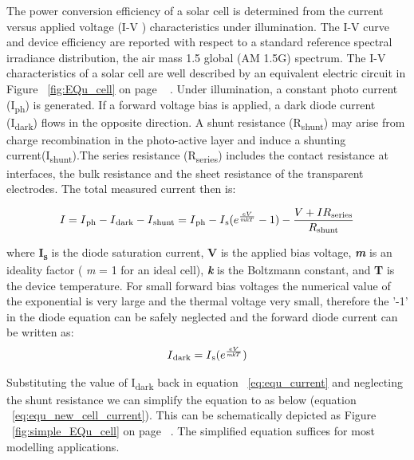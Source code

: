 The power conversion efficiency of a solar cell is determined from the current versus applied voltage (I-V ) characteristics under illumination. The I-V curve and device efficiency are reported with respect to a standard reference spectral irradiance distribution, the air mass 1.5 global (AM 1.5G) spectrum\cite{wenger2010strategies}. The I-V characteristics of a solar cell are well described by an equivalent electric circuit in Figure ~\ref{fig:EQu_cell} on page ~\pageref{fig:EQu_cell} . Under illumination, a constant photo current (I\textsubscript{ph}) is generated. If a forward voltage bias is applied, a dark diode current (I\textsubscript{dark}) flows in the opposite direction. A shunt resistance (R\textsubscript{shunt}) may arise from charge recombination in the photo-active layer and induce a shunting current(I\textsubscript{shunt}).The series resistance (R\textsubscript{series}) includes the contact resistance at interfaces, the bulk resistance and the sheet resistance of the transparent electrodes. The total measured current then is:
 
 \begin{equation}
 \begin{aligned}
  I = I\textsubscript{ph} - I\textsubscript{dark} - I\textsubscript{shunt} = I\textsubscript{ph} -  I\textsubscript{s} (e^{\frac{eV}{\textit{mk}T}}-1) - \dfrac{V+IR\textsubscript{series}}{R\textsubscript{shunt}}
   \label{eq:equ_current}
   \end{aligned}
   \end{equation}

 where \textbf{I\textsubscript{s}} is the diode saturation current, \textbf{V} is the applied bias voltage, \textbf{\textit{m}} is an ideality factor ( \textit{m} = 1 for an ideal cell), \textbf{\textit{k}} is the Boltzmann constant, and \textbf{T} is the device temperature\cite{wenger2010strategies}. For small forward bias voltages the numerical value of the exponential is very large and 
  the thermal voltage very small, therefore the '-1' in the diode equation can be safely neglected and the forward diode current can be written as\cite{pv_education_org}:
  \begin{equation}
   \begin{aligned}
    I\textsubscript{dark}= I\textsubscript{s} (e^{\frac{eV}{\textit{mk}T}}) 
    \label{eq:equ_current_dark}
    \end{aligned}
   \end{equation}
   
   Substituting the value of I\textsubscript{dark} back in equation ~\ref{eq:equ_current} and neglecting the shunt resistance we can simplify the equation to as below (equation ~\ref{eq:equ_new_cell_current}). This can be schematically depicted as Figure ~\ref{fig:simple_EQu_cell} on page ~\pageref{fig:simple_EQu_cell}. The simplified equation suffices for most modelling applications.
   
